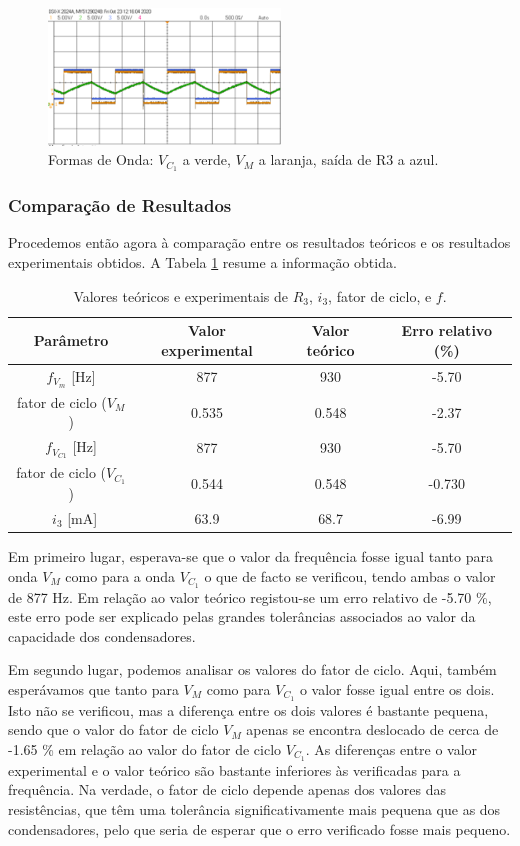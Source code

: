 \begin{figure}
    \centering
    \includegraphics[width = 0.55\textwidth]{Imagens/diodo.png}
    \caption{Formas de Onda: $V_{C_1}$ a verde, $V_M$ a laranja, saída de R3 a azul. }
    \label{fig:diodi}
\end{figure}


\subsubsection{Comparação de Resultados}
Procedemos então agora à comparação entre os resultados teóricos e os resultados experimentais obtidos. A Tabela \ref{tab:resultados_oscilador} resume a informação obtida.

\begin{table}[h!]
    \centering
    \caption{Valores teóricos e experimentais de $R_3$, $i_3$, fator de ciclo, e $f$.}
    \begin{tabular}{cccc}
    \hline
    Parâmetro & Valor experimental & Valor teórico & Erro relativo (\%) \\
    \hline  
    $f_{V_m}$ [Hz]  & 877  & 930  & -5.70 \\
    fator de ciclo ($V_M$) & 0.535  & 0.548 & -2.37 \\
    $f_{V_{C1}}$ [Hz]  & 877  & 930  & -5.70 \\
    fator de ciclo ($V_{C_1}$) & 0.544  & 0.548  & -0.730\\\
    $i_3$ [mA] & 63.9  & 68.7  & -6.99 \\
    \hline
    \end{tabular}
    \label{tab:resultados_oscilador}
\end{table}
Em primeiro lugar, esperava-se que o valor da frequência fosse igual tanto para onda $V_M$ como para a onda $V_{C_1}$ o que de facto se verificou, tendo ambas o valor de 877 Hz. Em relação ao valor teórico registou-se um erro relativo de -5.70 \%, este erro pode ser explicado pelas grandes tolerâncias associados ao valor da capacidade dos condensadores. 

Em segundo lugar, podemos analisar os valores do fator de ciclo. Aqui, também esperávamos que tanto para $V_M$ como para $V_{C_1}$ o valor fosse igual entre os dois. Isto não se verificou, mas a diferença entre os dois valores é bastante pequena, sendo que o valor do fator de ciclo $V_M$ apenas se encontra deslocado de cerca de -1.65 \% em relação ao valor do fator de ciclo $V_{C_1}$. As diferenças entre o valor experimental e o valor teórico são bastante inferiores às verificadas para a frequência. Na verdade, o fator de ciclo depende apenas dos valores das resistências, que têm uma tolerância significativamente mais pequena que as dos condensadores, pelo que seria de esperar que o erro verificado fosse mais pequeno. 

